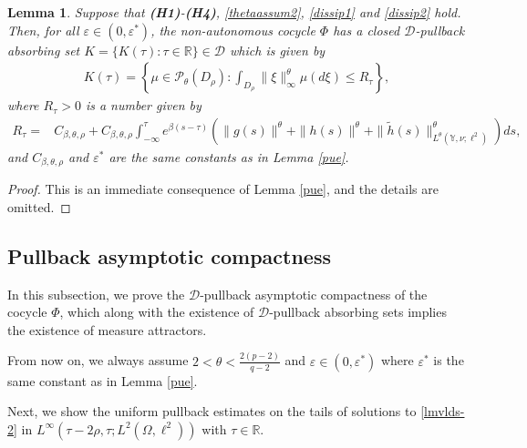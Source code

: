 \documentclass[11pt]{article}
\numberwithin{equation}{section}
\theoremstyle{plain}
\newtheorem{lemma}{Lemma}[section]
\begin{document}
\begin{lemma}\label{pas}
   Suppose that {\bf(H1)}-{\bf(H4)}, \eqref{thetaassum2}, \eqref{dissip1} and \eqref{dissip2} hold.
   Then, for all $\varepsilon \in (0,\varepsilon^{*})$, the non-autonomous cocycle $\Phi$ has a closed $\mathcal{D}$-pullback absorbing set
       $K = \{ K(\tau): \tau \in \mathbb{R} \} \in \mathcal{D}$
   which is given by
   \begin{align*}
      K(\tau) =
                \left\{ \mu \in \mathcal{P}_\theta(D_{\rho}):
                                \int_{D_{\rho}} \| \xi \|_{\infty}^{\theta} \mu(d \xi)
                                \le R_{\tau}
                \right\},
   \end{align*}
   where $  	R_{\tau} >0$ is a  number given by 
        \begin{align}
        	R_{\tau} = &C_{\beta,\theta,
        	\rho}+ C_{\beta,\theta, \rho} \int_{-\infty}^{\tau} e^{\beta (s-\tau) }
        \left( \|g(s)\|^{\theta} + \|h(s)\|^{\theta} 
       + \|\widetilde{h}(s)\|^{\theta}_{L^{\theta}(\mathbb{Y}, \nu; \ell^2)} 
        \right) ds  , 
        \end{align}
   and $C_{\beta,\theta, \rho}$ and $\varepsilon^*$ are 
   the same
    constants as in Lemma \ref{pue}.
\end{lemma}

\begin{proof}
This is an immediate consequence of
  Lemma \ref{pue}, and  the
  details  are omitted.
 \end{proof}
 

\subsection{Pullback asymptotic compactness}
 
 In this subsection,   we 
  prove the $\mathcal{D}$-pullback asymptotic compactness of 
  the cocycle $\Phi$, 
  which along with
  the existence of
  $\mathcal{D}$-pullback
  absorbing sets implies
  the existence of
  measure attractors.
   
 From now on, we always assume
 $2 < \theta < {\tfrac {2(p-2)}{q-2} }$ and
 $\varepsilon \in (0, \varepsilon^*)$
 where $\varepsilon^*$ is the  same constant  as in Lemma \ref{pue}.

  
 
 Next, we show the uniform pullback estimates on the tails of solutions to \eqref{lmvlds-2} in $L^\infty(\tau-2\rho, \tau; L^2(\Omega, \ell^2) )$
 with $\tau
 \in\mathbb{R}$.
\end{document}
